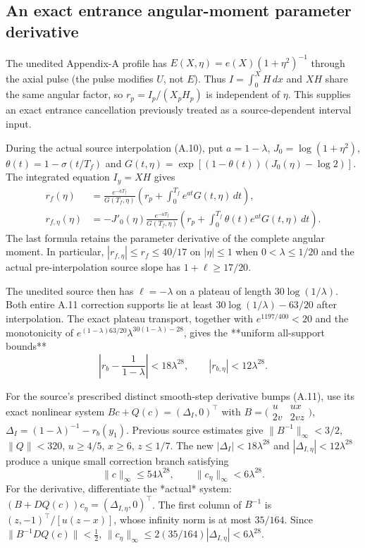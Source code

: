 \subsection*{An exact entrance angular-moment parameter derivative}
\label{subsec:a11-entrance-jet-20261021}
The unedited Appendix-A profile has $E(X,\eta)=e(X)(1+\eta^2)^{-1}$
through the axial pulse (the pulse modifies $U$, not $E$).
Thus $I=\int_0^XH\,dx$ and $XH$ share the same angular factor,
so $r_p=I_p/(X_pH_p)$ is independent of $\eta$.
This supplies an exact entrance cancellation previously treated as
a source-dependent interval input.

During the actual source interpolation (A.10), put
$a=1-\lambda$, $J_0=\log(1+\eta^2)$,
$\theta(t)=1-\sigma(t/T_f)$ and
$G(t,\eta)=\exp[(1-\theta(t))(J_0(\eta)-\log2)]$.
The integrated equation $I_y=XH$ gives
\begin{align}
 r_f(\eta)&=\frac{e^{-aT_f}}{G(T_f,\eta)}
   \left(r_p+\int_0^{T_f}e^{at}G(t,\eta)\,dt\right),\\
 r_{f,\eta}(\eta)&=-J'_0(\eta)\frac{e^{-aT_f}}{G(T_f,\eta)}
   \left(r_p+\int_0^{T_f}\theta(t)e^{at}G(t,\eta)\,dt\right).
 \label{eq:a11-new-entrance-eta}
\end{align}
The last formula retains the parameter derivative of the complete
angular moment. In particular, $|r_{f,\eta}|\le r_f\le40/17$
on $|\eta|\le1$ when $0<\lambda\le1/20$ and the actual
pre-interpolation source slope has $1+\ell\ge17/20$.

The unedited source then has $\ell=-\lambda$ on a plateau of
length $30\log(1/\lambda)$. Both entire A.11 correction supports
lie at least $30\log(1/\lambda)-63/20$ after interpolation.
The exact plateau transport, together with
$e^{1197/400}<20$ and the monotonicity of
$e^{(1-\lambda)63/20}\lambda^{30(1-\lambda)-28}$,
gives the **uniform all-support bounds**
\begin{equation}\label{eq:a11-new-rbjet}
  \left|r_b-\frac1{1-\lambda}\right|<18\lambda^{28},
  \qquad |r_{b,\eta}|<12\lambda^{28}.
\end{equation}

For the source's prescribed distinct smooth-step derivative
bumps (A.11), use its exact nonlinear system
$Bc+Q(c)=(\Delta_I,0)^\top$ with
$B=\bigl(\begin{smallmatrix}u&ux\\2v&2vz\end{smallmatrix}\bigr)$,
$\Delta_I=(1-\lambda)^{-1}-r_b(y_1)$.
Previous source estimates give
$\|B^{-1}\|_\infty<3/2$, $\|Q\|<320$,
$u\ge4/5$, $x\ge6$, $z\le1/7$.
The new $|\Delta_I|<18\lambda^{28}$ and
$|\Delta_{I,\eta}|<12\lambda^{28}$ produce a unique
small correction branch satisfying
\begin{equation}\label{eq:a11-new-cjet}
 \|c\|_\infty\le54\lambda^{28},
 \qquad \|c_\eta\|_\infty<6\lambda^{28}.
\end{equation}
For the derivative, differentiate the *actual* system:
$(B+DQ(c))c_\eta=(\Delta_{I,\eta},0)^\top$.
The first column of $B^{-1}$ is
$(z,-1)^\top/[u(z-x)]$, whose infinity norm is
at most $35/164$. Since
$\|B^{-1}DQ(c)\|<\tfrac12$,
$\|c_\eta\|_\infty\le2(35/164)|\Delta_{I,\eta}|
<6\lambda^{28}$.

